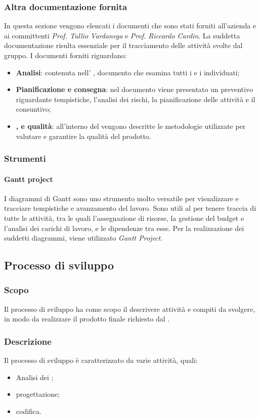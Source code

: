 \subsubsection{Altra documentazione fornita}
In questa sezione vengono elencati i documenti che sono stati forniti all'azienda \proponente{} e ai committenti \textit{Prof. Tullio Vardanega} e \textit{Prof. Riccardo Cardin}. La suddetta documentazione risulta essenziale per il tracciamento delle attività svolte dal gruppo.
I documenti forniti riguardano: 
\begin{itemize}
	\item \textbf{Analisi}: contenuta nell' \AdR{}, documento che esamina tutti i  e i  individuati;
	\item \textbf{Pianificazione e consegna}: nel documento \PdP{} viene presentato un preventivo riguardante tempistiche, l'analisi dei rischi, la pianificazione delle attività e il consuntivo;
	\item \textbf{,  e qualità}: all'interno del \PdQ{} vengono descritte le metodologie utilizzate per valutare e garantire la qualità del prodotto.
\end{itemize}
\subsubsection{Strumenti}
\paragraph{Gantt project}
I diagrammi di Gantt sono uno strumento molto versatile per visualizzare e tracciare tempistiche e avanzamento del lavoro. Sono utili al \RdP{} per tenere traccia di tutte le attività, tra le quali l'assegnazione di risorse, la gestione del budget e l'analisi dei carichi di lavoro, e le dipendenze tra esse. Per la realizzazione dei suddetti diagrammi, viene utilizzato \textit{Gantt Project}.
\subsection{Processo di sviluppo}
\subsubsection{Scopo}
Il processo di sviluppo ha come scopo il descrivere attività e compiti da svolgere, in modo da realizzare il prodotto finale richiesto dal .
\subsubsection{Descrizione}
Il processo di sviluppo è caratterizzato da varie attività, quali:
\begin{itemize}
	\item Analisi dei ;
	\item progettazione;
	\item codifica.
\end{itemize}
